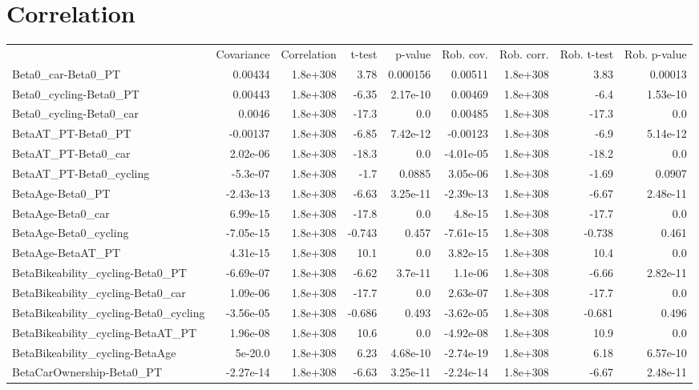 \section{Correlation}
\begin{tabular}{lrrrrrrrr}
 & Covariance & Correlation & t-test & p-value & Rob. cov. & Rob. corr. & Rob. t-test & Rob. p-value \\
Beta0_car-Beta0_PT & 0.00434 & 1.8e+308 & 3.78 & 0.000156 & 0.00511 & 1.8e+308 & 3.83 & 0.00013 \\
Beta0_cycling-Beta0_PT & 0.00443 & 1.8e+308 & -6.35 & 2.17e-10 & 0.00469 & 1.8e+308 & -6.4 & 1.53e-10 \\
Beta0_cycling-Beta0_car & 0.0046 & 1.8e+308 & -17.3 & 0.0 & 0.00485 & 1.8e+308 & -17.3 & 0.0 \\
BetaAT_PT-Beta0_PT & -0.00137 & 1.8e+308 & -6.85 & 7.42e-12 & -0.00123 & 1.8e+308 & -6.9 & 5.14e-12 \\
BetaAT_PT-Beta0_car & 2.02e-06 & 1.8e+308 & -18.3 & 0.0 & -4.01e-05 & 1.8e+308 & -18.2 & 0.0 \\
BetaAT_PT-Beta0_cycling & -5.3e-07 & 1.8e+308 & -1.7 & 0.0885 & 3.05e-06 & 1.8e+308 & -1.69 & 0.0907 \\
BetaAge-Beta0_PT & -2.43e-13 & 1.8e+308 & -6.63 & 3.25e-11 & -2.39e-13 & 1.8e+308 & -6.67 & 2.48e-11 \\
BetaAge-Beta0_car & 6.99e-15 & 1.8e+308 & -17.8 & 0.0 & 4.8e-15 & 1.8e+308 & -17.7 & 0.0 \\
BetaAge-Beta0_cycling & -7.05e-15 & 1.8e+308 & -0.743 & 0.457 & -7.61e-15 & 1.8e+308 & -0.738 & 0.461 \\
BetaAge-BetaAT_PT & 4.31e-15 & 1.8e+308 & 10.1 & 0.0 & 3.82e-15 & 1.8e+308 & 10.4 & 0.0 \\
BetaBikeability_cycling-Beta0_PT & -6.69e-07 & 1.8e+308 & -6.62 & 3.7e-11 & 1.1e-06 & 1.8e+308 & -6.66 & 2.82e-11 \\
BetaBikeability_cycling-Beta0_car & 1.09e-06 & 1.8e+308 & -17.7 & 0.0 & 2.63e-07 & 1.8e+308 & -17.7 & 0.0 \\
BetaBikeability_cycling-Beta0_cycling & -3.56e-05 & 1.8e+308 & -0.686 & 0.493 & -3.62e-05 & 1.8e+308 & -0.681 & 0.496 \\
BetaBikeability_cycling-BetaAT_PT & 1.96e-08 & 1.8e+308 & 10.6 & 0.0 & -4.92e-08 & 1.8e+308 & 10.9 & 0.0 \\
BetaBikeability_cycling-BetaAge & 5e-20.0 & 1.8e+308 & 6.23 & 4.68e-10 & -2.74e-19 & 1.8e+308 & 6.18 & 6.57e-10 \\
BetaCarOwnership-Beta0_PT & -2.27e-14 & 1.8e+308 & -6.63 & 3.25e-11 & -2.24e-14 & 1.8e+308 & -6.67 & 2.48e-11 \\

\end{tabular}
